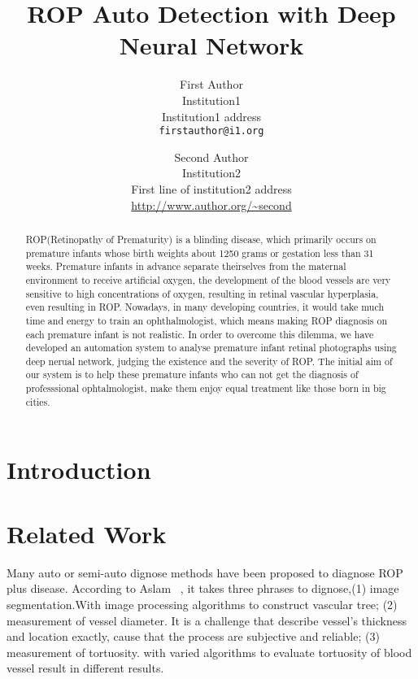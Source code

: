 \documentclass[10pt,twocolumn,letterpaper]{article}
\begin{document}
\title{ROP Auto Detection with Deep Neural Network}

\author{First Author\\
Institution1\\
Institution1 address\\
{\tt\small firstauthor@i1.org}
\and
Second Author\\
Institution2\\
First line of institution2 address\\
{\small\url{http://www.author.org/~second}}
}

\maketitle

\begin{abstract}
    ROP(Retinopathy of Prematurity) is a blinding disease, which primarily occurs on premature infants whose birth weights about 1250 grams or gestation less than 31 weeks.
    Premature infants in advance separate theirselves from the maternal environment to receive artificial oxygen, the development of the blood vessels are very sensitive to high concentrations of oxygen, resulting in retinal vascular hyperplasia, even resulting in ROP.
    Nowadays, in many developing countries, it would take much time and energy to train an ophthalmologist, which means making ROP diagnosis on each premature infant is not realistic. In order to overcome this dilemma, we have developed an automation system to analyse premature infant retinal photographs using deep nerual network, judging the existence and the severity of ROP.
    The initial aim of our system is to help these premature infants who can not get the diagnosis of professsional ophtalmologist, make them enjoy equal treatment like those born in big cities.
\end{abstract}

\section{Introduction}


\section{Related Work}
  Many auto or semi-auto dignose methods have been proposed to diagnose ROP plus disease. According to Aslam \etal~\cite{},  it takes three phrases to dignose,(1) image segmentation.With image processing algorithms to construct vascular tree; (2) measurement of vessel diameter. It is a challenge that describe vessel's thickness and location exactly, cause that the process are subjective and reliable; (3) measurement of tortuosity. with varied algorithms to evaluate tortuosity of blood vessel result in different results.
\end{document}
